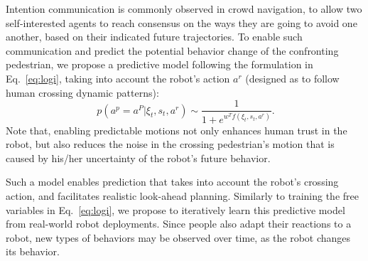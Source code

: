\documentclass[conference]{IEEEtran}
\begin{document}
Intention communication is commonly observed in crowd navigation, to allow two 
self-interested agents to reach 
consensus on the ways they are going to avoid one another, based on their 
indicated future trajectories. To enable 
such communication and predict the potential behavior change of the confronting 
pedestrian, we propose a predictive model following the formulation in 
Eq.~\ref{eq:logi}, taking into account the robot's action $a^r$ (designed as 
to follow human crossing dynamic patterns):
\begin{equation}~\label{eq:transition}
p(a^p=a^P|\xi_t, s_t, a^r) \sim \frac{1}{1+e^{w^Tf(\xi_t,s_t,a^r)}}.
\end{equation}
Note that, enabling predictable motions not only enhances human trust in the 
robot, but also reduces the noise in the crossing pedestrian's motion that is 
caused by his/her uncertainty of the robot's future behavior.

Such a model enables prediction that takes into account the 
robot's crossing action, and facilitates realistic look-ahead planning. 
Similarly to training the free variables in Eq.~\ref{eq:logi}, we propose to iteratively learn 
this predictive model from real-world robot 
deployments. Since people also adapt their reactions to a robot, 
new types of behaviors may be observed over time, as the robot changes its behavior.


\end{document}
